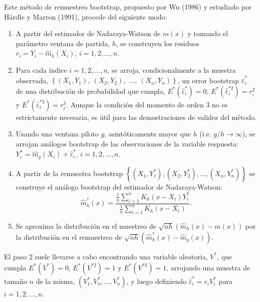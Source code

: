 \documentclass[
]{book}
\theoremstyle{break}
\theoremstyle{definition}
\theoremstyle{definition}
\theoremstyle{definition}
\theoremstyle{definition}
\theoremstyle{remark}
\begin{document}
Este método de remuestreo bootstrap, propuesto por Wu (1986) y estudiado
por Härdle y Marron (1991), procede del siguiente modo:

\begin{enumerate}
\def\labelenumi{\arabic{enumi}.}
\item
  A partir del estimador de Nadaraya-Watson de \(m\left( x \right)\) y
  tomando el parámetro ventana de partida, \(h\), se construyen los
  residuos
  \(r_i = Y_i - \hat{m}_{h}\left( X_i \right)\),
  \(i=1, 2, \ldots, n\).
\item
  Para cada índice \(i=1,2,\ldots ,n\), se arroja, condicionalmente a la
  muestra observada, \(\left\{ \left( X_1,Y_1 \right), \ \left( X_2,Y_2 \right),\right.\)
  \(\left.\ldots ,\ \left( X_n,Y_n \right) \right\}\),
  un error bootstrap \(\hat{\varepsilon}_i^{\ast}\) de una
  distribución de probabilidad que cumpla,
  \(E^{\ast}\left( \hat{\varepsilon}_i^{\ast} \right) =0\),
  \(E^{\ast}\left( \hat{\varepsilon}_i^{\ast 2} \right) =r_i^2\) y
  \(E^{\ast}\left( \hat{\varepsilon}_i^{\ast 3} \right) =r_i^{3}\).
  Aunque la condición del momento de orden 3 no es estrictamente necesaria,
  es útil para las demostraciones de validez del método.
\item
  Usando una ventana piloto \(g\), asintóticamente mayor que \(h\) (i.e.
  \(g/h\rightarrow \infty\)), se arrojan análogos bootstrap de las
  observaciones de la variable respuesta:
  \(Y_i^{\ast}=\hat{m}_{g}\left(X_i \right)  +\hat{\varepsilon}_i^{\ast}\), \(i=1,2,\ldots ,n\).
\item
  A partir de la remuestra bootstrap \(\left\{ \left( X_1,Y_1^{\ast } \right),\left( X_2,Y_2^{\ast} \right),\ldots ,\left( X_n,Y_n^{\ast} \right) \right\}\) se construye el análogo
  bootstrap del estimador de Nadaraya-Watson:
  \[\hat{m}_{h}^{\ast}\left( x \right) =\frac{\frac{1}{n}\sum_{i=1}^{n}K_{h}
  \left( x-X_i \right) Y_i^{\ast}}{\frac{1}{n}\sum_{i=1}^{n}K_{h}\left(
  x-X_i \right)}.\]
\item
  Se aproxima la distribución en el muestreo de \(\sqrt{nh}\left( \hat{m}_{h}\left( x \right) -m\left( x \right) \right)\) por la
  distribución en el remuestreo de
  \(\sqrt{nh}\left( \hat{m}_{h}^{\ast}\left( x \right) - \hat{m}_{g}\left( x \right) \right)\).
\end{enumerate}

El paso 2 suele llevarse a cabo encontrando una variable aleatoria,
\(V^{\ast}\), que cumpla \(E^{\ast}\left( V^{\ast} \right) =0\), \(E^{\ast}\left( V^{\ast 2} \right) =1\) y \(E^{\ast}\left( V^{\ast 3} \right) =1\),
arrojando una muestra de tamaño \(n\) de la misma,
\(\left( V_1^{\ast},V_n^{\ast},\ldots ,V_n^{\ast} \right)\), y luego
definiendo \(\hat{\varepsilon}_i^{\ast} = r_iV_i^{\ast}\)
para \(i=1, 2, \ldots, n\).
\end{document}
